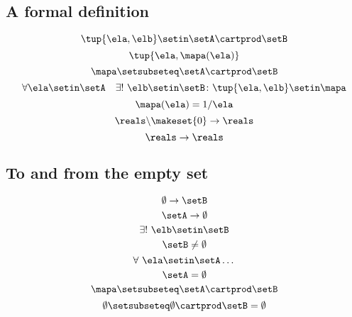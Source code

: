 \begin{forslides}
\subsection{A formal definition}

\begin{equation}\label{eq:slides_session2_107}
\tup{\ela, \elb} \setin\setA \cartprod \setB
\end{equation}
\begin{equation}\label{eq:slides_session2_108}
\tup{\ela, \mapa(\ela)}
\end{equation}
\begin{equation}\label{eq:slides_session2_109}
\mapa \setsubseteq \setA \cartprod \setB
\end{equation}
\begin{equation}\label{eq:slides_session2_110}
\forall \ela \setin\setA  \quad  \exists !
        \ \elb \setin\setB \colon \tup{\ela,\elb} \setin\mapa
\end{equation}
\begin{equation}\label{eq:slides_session2_111}
\mapa(\ela) = 1/ \ela
\end{equation}
\begin{equation}\label{eq:slides_session2_112}
\reals \backslash \makeset{ 0 } \to \reals
\end{equation}
\begin{equation}\label{eq:slides_session2_113}
\reals \to \reals
\end{equation}

\subsection{To and from the empty set}

\begin{equation}\label{eq:slides_session2_114}
\emptyset \to \setB
\end{equation}
\begin{equation}\label{eq:slides_session2_115}
\setA \to \emptyset
\end{equation}
\begin{equation}\label{eq:slides_session2_116}
\exists ! \ \elb \setin\setB
\end{equation}
\begin{equation}\label{eq:slides_session2_117}
\setB \neq \emptyset
\end{equation}
\begin{equation}\label{eq:slides_session2_118}
\forall \ \ela \setin\setA \dots
\end{equation}
\begin{equation}\label{eq:slides_session2_119}
\setA = \emptyset
\end{equation}
\begin{equation}\label{eq:slides_session2_120}
\mapa \setsubseteq \setA \cartprod \setB
\end{equation}
\begin{equation}\label{eq:slides_session2_121}
\emptyset \setsubseteq \emptyset \cartprod \setB = \emptyset
\end{equation}


\end{forslides}
